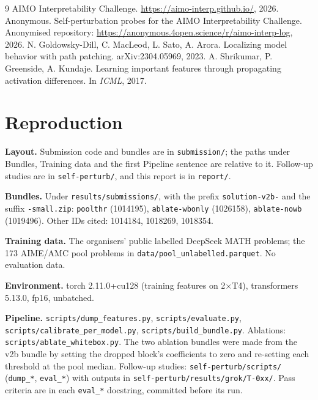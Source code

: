 \documentclass{article}
\begin{document}
\begin{thebibliography}{9}
 AIMO Interpretability Challenge. \url{https://aimo-interp.github.io/}, 2026.
 Anonymous. Self-perturbation probes for the AIMO Interpretability Challenge. Anonymised repository: \url{https://anonymous.4open.science/r/aimo-interp-log}, 2026.
 N. Goldowsky-Dill, C. MacLeod, L. Sato, A. Arora. Localizing model behavior with path patching. arXiv:2304.05969, 2023.
 A. Shrikumar, P. Greenside, A. Kundaje. Learning important features through propagating activation differences. In \emph{ICML}, 2017.
\end{thebibliography}

\appendix
\section{Reproduction}
\label{app:repro}

\textbf{Layout.} Submission code and bundles are in \texttt{submission/}; the paths under Bundles, Training data and the first Pipeline sentence are relative to it. Follow-up studies are in \texttt{self-perturb/}, and this report is in \texttt{report/}.

\textbf{Bundles.} Under \texttt{results/submissions/}, with the prefix \texttt{solution-v2b-} and the suffix \texttt{-small.zip}: \texttt{poolthr} (1014195), \texttt{ablate-wbonly} (1026158), \texttt{ablate-nowb} (1019496). Other IDs cited: 1014184, 1018269, 1018354.

\textbf{Training data.} The organisers' public labelled DeepSeek MATH problems; the 173 AIME/AMC pool problems in \texttt{data/pool\_unlabelled.parquet}. No evaluation data.

\textbf{Environment.} torch 2.11.0+cu128 (training features on 2$\times$T4), transformers 5.13.0, fp16, unbatched.

\textbf{Pipeline.} \texttt{scripts/dump\_features.py}, \texttt{scripts/evaluate.py}, \texttt{scripts/calibrate\_per\_model.py}, \texttt{scripts/build\_bundle.py}. Ablations: \texttt{scripts/ablate\_whitebox.py}. The two ablation bundles were made from the v2b bundle by setting the dropped block's coefficients to zero and re-setting each threshold at the pool median. Follow-up studies: \texttt{self-perturb/scripts/} (\texttt{dump\_*}, \texttt{eval\_*}) with outputs in \texttt{self-perturb/results/grok/T-0xx/}. Pass criteria are in each \texttt{eval\_*} docstring, committed before its run.
\end{document}
